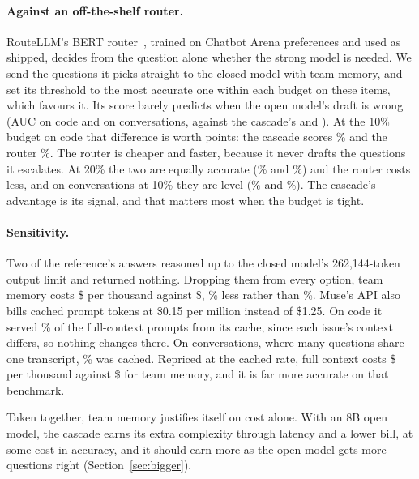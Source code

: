\documentclass[10pt,twocolumn]{article}
\begin{document}
\paragraph{Against an off-the-shelf router.} RouteLLM's BERT router~\citep{ong2025routellm}, trained on Chatbot Arena preferences and used as shipped, decides from the question alone whether the strong model is needed. We send the questions it picks straight to the closed model with team memory, and set its threshold to the most accurate one within each budget on these items, which favours it. Its score barely predicts when the open model's draft is wrong (AUC \aucRouterSwe{} on code and \aucRouterLoco{} on conversations, against the cascade's \aucCascadeSwe{} and \aucCascadeLoco). At the 10\% budget on code that difference is worth points: the cascade scores \accCascadeCost\% and the router \accRouterCost\%. The router is cheaper and faster, because it never drafts the questions it escalates. At 20\% the two are equally accurate (\accCascadeTwentyCost\% and \accRouterTwentyCost\%) and the router costs less, and on conversations at 10\% they are level (\accLocoCascadeCost\% and \accLocoRouter\%). The cascade's advantage is its signal, and that matters most when the budget is tight.

\paragraph{Sensitivity.} Two of the reference's answers reasoned up to the closed model's 262{,}144-token output limit and returned nothing. Dropping them from every option, team memory costs \$\usdMemoryNoRunaway{} per thousand against \$\usdDirectNoRunaway, \dropMemoryNoRunaway\% less rather than \dropMemory\%. Muse's API also bills cached prompt tokens at \$0.15 per million instead of \$1.25. On code it served \cachedShareSwe\% of the full-context prompts from its cache, since each issue's context differs, so nothing changes there. On conversations, where many questions share one transcript, \museCachedLoco\% was cached. Repriced at the cached rate, full context costs \$\usdLocoDirectCached{} per thousand against \$\usdLocoMemoryCached{} for team memory, and it is far more accurate on that benchmark.

Taken together, team memory justifies itself on cost alone. With an 8B open model, the cascade earns its extra complexity through latency and a lower bill, at some cost in accuracy, and it should earn more as the open model gets more questions right (Section~\ref{sec:bigger}).
\end{document}
